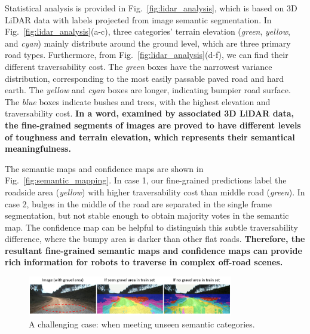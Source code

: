 \documentclass[letterpaper, 10 pt, conference]{ieeeconf}  %
\begin{document}
	Statistical analysis is provided in Fig.~\ref{fig:lidar_analysis}, which is based on 3D LiDAR data with labels projected from image semantic segmentation.
	In Fig.~\ref{fig:lidar_analysis}(a-c), three categories' terrain elevation (\textit{green}, \textit{yellow}, and \textit{cyan}) mainly distribute around the ground level, which are three primary road types. Furthermore, from Fig.~\ref{fig:lidar_analysis}(d-f), we can find their different traversability cost. The \textit{green} boxes have the narrowest variance distribution, corresponding to the most easily passable paved road and hard earth. The \textit{yellow} and \textit{cyan} boxes are longer, indicating bumpier road surface. The \textit{blue} boxes indicate bushes and trees, with the highest elevation and traversability cost.
	\textbf{In a word, examined by associated 3D LiDAR data, the fine-grained segments of images are proved to have different levels of toughness and terrain elevation, which represents their semantical meaningfulness.}
	
	The semantic maps and confidence maps are shown in Fig.~\ref{fig:semantic_mapping}. In case 1, our fine-grained predictions label the roadside area (\textit{yellow}) with higher traversability cost than middle road (\textit{green}). In case 2, bulges in the middle of the road are separated in the single frame segmentation, but not stable enough to obtain majority votes in the semantic map. The confidence map can be helpful to distinguish this subtle traversability difference, where the bumpy area is darker than other flat roads. \textbf{Therefore, the resultant fine-grained semantic maps and confidence maps can provide rich information for robots to traverse in complex off-road scenes.}
	
	\begin{figure}[]
		\centering
		\includegraphics[width=0.8\textwidth]{challenges.pdf}
		\caption{A challenging case: when meeting unseen semantic categories.}
		\label{fig:challenges}
		\vspace{-4mm}
	\end{figure}
	
\end{document}
